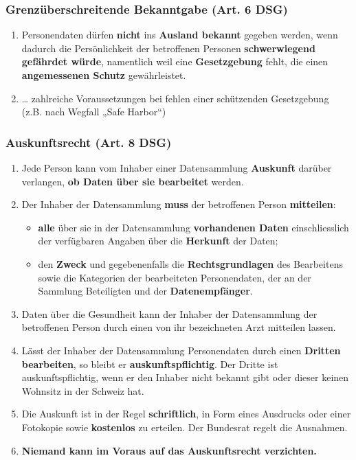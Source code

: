 \subsubsection{Grenzüberschreitende Bekanntgabe (Art. 6 DSG)}
\label{sec:Datenschutz-Grenzübergreifend}

\begin{enumerate}
	\tightlist
	\item Personendaten dürfen \textbf{nicht} ins \textbf{Ausland bekannt}
	gegeben werden, wenn dadurch die Persönlichkeit der betroffenen
	Personen \textbf{schwerwiegend gefährdet würde}, namentlich weil eine
	\textbf{Gesetzgebung} fehlt, die einen \textbf{angemessenen Schutz}
	gewährleistet.
	\item \ldots{} zahlreiche Voraussetzungen bei fehlen einer schützenden
	Gesetzgebung (z.B. nach Wegfall „Safe Harbor``)
\end{enumerate}

\subsubsection{Auskunftsrecht (Art. 8 DSG)}
\label{sec:Datenschutz-Auskunftsrecht}

\begin{enumerate}
	\tightlist
	\item Jede Person kann vom Inhaber einer Datensammlung \textbf{Auskunft}
	darüber verlangen, \textbf{ob Daten über sie bearbeitet} werden.
	\item Der Inhaber der Datensammlung \textbf{muss} der betroffenen Person
	\textbf{mitteilen}:
	\begin{itemize}
		\tightlist
		\item \textbf{alle} über sie in der Datensammlung \textbf{vorhandenen
		Daten} einschliesslich der verfügbaren Angaben über die
		\textbf{Herkunft} der Daten;
		\item den \textbf{Zweck} und gegebenenfalls die
		\textbf{Rechtsgrundlagen} des Bearbeitens sowie die Kategorien der
		bearbeiteten Personendaten, der an der Sammlung Beteiligten und der
		\textbf{Datenempfänger}.
	\end{itemize}
	\item Daten über die Gesundheit kann der Inhaber der Datensammlung der
	betroffenen Person durch einen von ihr bezeichneten Arzt mitteilen
	lassen.
	\item Lässt der Inhaber der Datensammlung Personendaten durch einen
	\textbf{Dritten bearbeiten}, so bleibt er \textbf{auskunftspflichtig}.
	Der Dritte ist auskunftspflichtig, wenn er den Inhaber nicht bekannt
	gibt oder dieser keinen Wohnsitz in der Schweiz hat.
	\item Die Auskunft ist in der Regel \textbf{schriftlich}, in Form eines
	Ausdrucks oder einer Fotokopie sowie \textbf{kostenlos} zu erteilen.
	Der Bundesrat regelt die Ausnahmen.
	\item \textbf{Niemand kann im Voraus auf das Auskunftsrecht verzichten.}
\end{enumerate}

